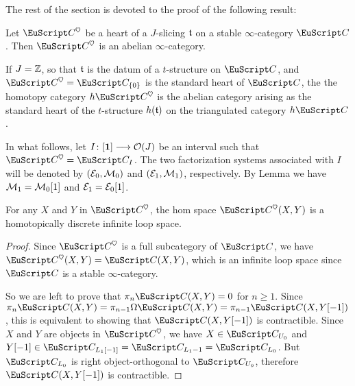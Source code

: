 The rest of the section is devoted to the proof of the following result:
\begin{theorem}\label{heart.is.abelian}
Let $\C^\heart$ be a heart of a $J$-slicing $\mathfrak{t}$ on a stable $\infty$-category $\C$. Then $\C^\heart$ is an abelian $\infty$-category.\end{theorem}
\begin{remark}
If $J=\mathbb{Z}$, so that $\mathfrak{t}$ is the datum of a $t$-structure on $\C$, and $\C^\heart=\C_{\{0\}}$ is the standard heart of $\C$, the the  homotopy category $h\C^\heart$ is the abelian category arising as the standard heart of the $t$-structure $h(\mathfrak{t})$ on the triangulated category $h\C$.
\end{remark}
In what follows, let $I\colon [\mathbf{1}] \longrightarrow \mathcal{O}(J)$ be an interval such that $\C^\heart=\C_I$. The two factorization systems associated with $I$ will be denoted by $(\mathcal{E}_0,\mathcal{M}_0)$ and $(\mathcal{E}_1,\mathcal{M}_1)$, respectively. By Lemma  we have $\mathcal{M}_1=\mathcal{M}_0[1]$ and $\mathcal{E}_1=\mathcal{E}_0[1]$.
\begin{lemma}
For any $X$ and $Y$ in $\C^\heart$, the hom space $\C^\heart(X,Y)$ is a homotopically discrete infinite loop space.
\end{lemma}
\begin{proof}
Since $\C^\heart$ is a full subcategory of $\C$, we have $\C^\heart(X,Y)=\C(X,Y)$, which is an infinite loop space since $\C$ is a stable $\infty$-category. 

So we are left to prove that $\pi_n\C(X,Y)=0$ for $n\geq 1$. Since $\pi_n\C(X,Y)=\pi_{n-1}\Omega\C(X,Y)=\pi_{n-1}\C(X,Y[-1])$, this is equivalent to showing that 
$\C(X,Y[-1])$ is contractible. Since $X$ and $Y$ are objects in $\C^\heart$, we have $X\in \C_{U_0}$ and $Y[-1]\in \C_{L_1[-1]}=\C_{L_1-1}=\C_{L_0}$. But $\C_{L_0}$ is right object-orthogonal to $\C_{U_0}$, therefore $\C(X,Y[-1])$ is contractible.
\end{proof}

